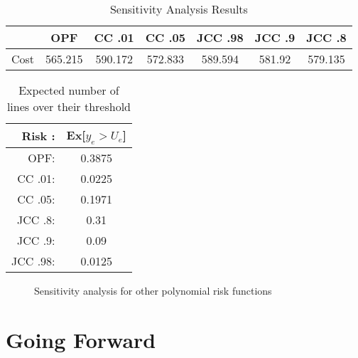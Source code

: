 %


\begin{table}
\centering
 \begin{tabular}{ |c| c c c c c c|}
\hline
& OPF & CC .01 & CC .05 & JCC .98 & JCC .9 & JCC .8 \\
\hline
\hline
Cost & 565.215 & 590.172 & 572.833& 589.594 & 581.92 &579.135\\
\hline
\end{tabular}
\caption{Sensitivity Analysis Results}
\end{table}


\begin{table}
\centering
\begin{tabular}{| r  c |}
\hline
Risk :& Ex[$y_e > U_e$] \\
\hline
\hline
OPF:& 0.3875\\
CC .01:& 0.0225\\
CC .05:& 0.1971 \\
JCC .8:& 0.31 \\
JCC .9:& 0.09 \\
JCC .98:& 0.0125 \\
\hline
\end{tabular}
\caption{Expected number of lines over their threshold}
\end{table}

\begin{figure}

\caption{Sensitivity analysis for other polynomial risk functions}\label{figsense}
\end{figure}


\section{Going Forward}

